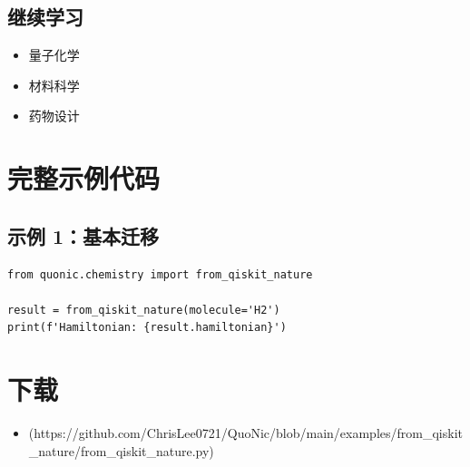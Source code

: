 \documentclass[12pt,a4paper]{article}
\begin{document}
\subsection{继续学习}
\begin{itemize}
  \item 量子化学
  \item 材料科学
  \item 药物设计
\end{itemize}

\section{完整示例代码}

\subsection{示例 1：基本迁移}

\begin{verbatim}
from quonic.chemistry import from_qiskit_nature

result = from_qiskit_nature(molecule='H2')
print(f'Hamiltonian: {result.hamiltonian}')
\end{verbatim}

\section{下载}

\begin{itemize}
  \item [from\_qiskit\_nature.py](https://github.com/ChrisLee0721/QuoNic/blob/main/examples/from_qiskit_nature/from_qiskit_nature.py)
\end{itemize}
\end{document}
